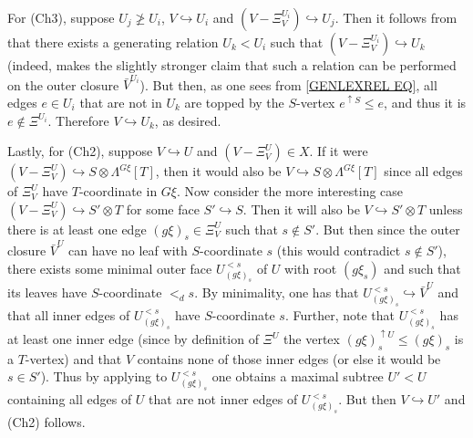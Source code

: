 \documentclass[a4paper,10pt,draft]{article}%
\begin{document}
\begin{example}
For (Ch3), suppose $U_j \not \geq U_i$, 
$V \hookrightarrow U_i$ and
$(V - \Xi^{U_i}_V) \hookrightarrow U_j$.
Then it follows from \cite[Lemma 7.37]{Per17}
that there exists a generating relation $U_k < U_i$
such that $(V - \Xi^{U_i}_V) \hookrightarrow U_k$
(indeed, \cite[Lemma 7.37]{Per17} makes the slightly stronger claim that such a relation can be performed on the outer closure $\bar{V}^{U_i}$). But then, as one sees from \eqref{GENLEXREL EQ},
all edges $e \in U_i$ that are not in $U_k$ are topped by the $S$-vertex $e^{\uparrow S}\leq e$, and thus it is $e \not \in \Xi^{U_i}$. Therefore $V \hookrightarrow U_k$, as desired.


Lastly, for (Ch2), suppose $V \hookrightarrow U$ and 
$(V - \Xi^{U}_V) \in X$.
If it were 
$(V-\Xi^{U}_V) \hookrightarrow S \otimes \Lambda^{G \xi}[T]$, then it would also be 
$V \hookrightarrow S \otimes \Lambda^{G \xi}[T]$
since all edges of $\Xi^{U}_V$ have 
$T$-coordinate in $G\xi$.
Now consider the more interesting case
$(V - \Xi^{U}_V) \hookrightarrow S' \otimes T$
for some face $S' \hookrightarrow S$.
Then it will also be 
$V \hookrightarrow S' \otimes T$
unless there is at least one edge
$(g \xi)_s \in \Xi^{U}_V$ such that $s \not \in S'$.
But then since the outer closure $\bar{V}^U$ can have no leaf with $S$-coordinate $s$ (this would contradict $s \not \in S'$),
there exists some minimal outer face $U_{(g\xi)_s}^{<s}$ of $U$ with root $(g\xi_s)$ and such that its leaves have $S$-coordinate $<_d s$.
By minimality, one has that $U_{(g\xi)_s}^{<s} \hookrightarrow \bar{V}^U$ and that all inner edges of $U_{(g\xi)_s}^{<s}$ have
$S$-coordinate $s$.
Further, note that $U_{(g\xi)_s}^{<s}$
has at least one inner edge
(since by definition of $\Xi^U$ the vertex 
$(g \xi)_s^{\uparrow U} \leq (g \xi)_s$ is a $T$-vertex)
and that $V$ contains none of those inner edges (or else it would be $s \in S'$).
Thus by applying \cite[Lemma 7.34]{Per17}
to $U_{(g\xi)_s}^{<s}$ one obtains a maximal subtree $U' < U$
containing all edges of $U$ that are not inner edges of $U_{(g\xi)_s}^{<s}$.
But then $V \hookrightarrow U'$ and (Ch2) follows.
\end{example}
\end{document}

